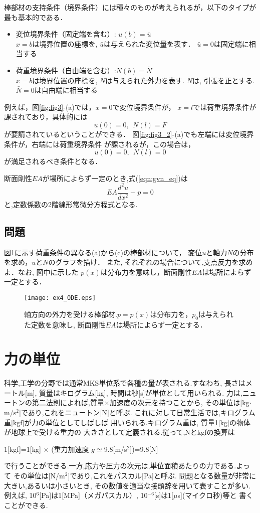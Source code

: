 \documentclass[10pt,a4j]{jbook}
\begin{document}
棒部材の支持条件（境界条件）には種々のものが考えられるが，以下のタイプが最も基本的である．
\begin{itemize}
\item
変位境界条件（固定端を含む）: $u(b)=\bar{u}$\\
	$x=b$は境界位置の座標を, $\bar u$は与えられた変位量を表す．
	$\bar u=0$は固定端に相当する
\item
荷重境界条件（自由端を含む）:$N(b)=\bar{N}$\\
	 $x=b$は境界位置の座標を, $\bar N$は与えられた外力を表す.
	$\bar{N}$は, 引張を正とする. $\bar N=0$は自由端に相当する
\end{itemize}
例えば，図\ref{fig:fig3}-(a)では，$x=0$で変位境界条件が，
$x=l$では荷重境界条件が課されており，具体的には
\[
	u(0)=0, \ \ N(l)=F
\]
が要請されているということができる．
図\ref{fig:fig3_2}-(a)でも左端には変位境界条件が，右端には荷重境界条件
が課されるが，この場合は，
\[
	u(0)=0, \ \ N(l)=0
\]
が満足されるべき条件となる．

断面剛性$EA$が場所によらず一定のとき,式(\ref{eqn:gvn_eq})は
\begin{equation}
	EA\frac{d^2u}{dx^2}+p=0
	\label{eqn:gvn_eq2}
\end{equation}
と,定数係数の2階線形常微分方程式となる.
\subsection{問題}
図\ref{fig:fig4}に示す荷重条件の異なる(a)から(c)の棒部材について，
変位$u$と軸力$N$の分布を求め，$u$と$N$のグラフを描け．
また, それぞれの場合について,支点反力を求めよ．なお, 図中に示した
$p(x)$は分布力を意味し，断面剛性$EA$は場所によらず一定とする．
\begin{figure}[h]
	\begin{center}
	\texttt{[image: ex4\_ODE.eps]} 
	\end{center}
	\caption{軸方向の外力を受ける棒部材.$p=p(x)$は分布力を，$p_0$は与えられた定数を意味し, 
	断面剛性$EA$は場所によらず一定とする．} 
	\label{fig:fig4}
\end{figure}
\section{力の単位}
科学,工学の分野では通常MKS単位系で各種の量が表される.すなわち, 
長さはメートル[m], 質量はキログラム[kg], 時間は秒[s]が単位として用いられる.
力は,ニュートンの第二法則によれば,質量×加速度の次元を持つことから, 
その単位は[kg$\cdot$m/s$^2$]であり,これをニュートン[N]と呼ぶ.
これに対して日常生活では,キログラム重[kgf]が力の単位としてしばしば
用いられる.キログラム重は, 質量1[kg]の物体が地球上で受ける重力の
大きさとして定義される.従って,Nとkgfの換算は
\begin{center}
	1[kgf]=1[kg] $\times$ (重力加速度  $g\simeq$9.8[m/s$^2$])=9.8[N]
\end{center}
で行うことができる.一方,応力や圧力の次元は,単位面積あたりの力である.よって
その単位は[N/m$^2$]であり,これをパスカル[Pa]と呼ぶ.
問題となる数量が非常に大きい,あるいは小さいとき,
その数値を適当な接頭辞を用いて表すことが多い.例えば,
10$^6$[Pa]は1[MPa]（メガパスカル）, 10$^{-6}$[s]は1[$\mu$s](マイクロ秒)等と
書くことができる.
\clearpage
\end{document}
